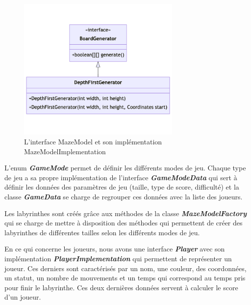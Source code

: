\begin{figure}[htb]
    \centering
    \includegraphics[width=8cm]{ressources/Implementation/Labyrinthe/Modele/DepthFirstGenerator.png}
    \caption{L'interface MazeModel et son implémentation MazeModelImplementation}
    \label{fig:MazeModelAndImplementation}
\end{figure}

L'enum \textbf{\textit{GameMode}} permet de définir les différents modes de
jeu. Chaque type de jeu a sa propre implémentation de l'interface
\textbf{\textit{GameModeData}} qui sert à définir les données des paramètres de
jeu (taille, type de score, difficulté) et la classe \textbf{\textit{GameData}}
se charge de regrouper ces données avec la liste des joueurs.

Les labyrinthes sont créés grâce aux méthodes de la classe
\textbf{\textit{MazeModelFactory}} qui se charge de mettre à disposition des
méthodes qui permettent de créer des labyrinthes de différentes tailles selon
les différents modes de jeu.

En ce qui concerne les joueurs, nous avons une interface
\textbf{\textit{Player}} avec son implémentation
\textbf{\textit{PlayerImplementation}} qui permettent de représenter un joueur.
Ces derniers sont caractérisés par un nom, une couleur, des coordonnées, un
statut, un nombre de mouvements et un temps qui correspond au temps pris pour
finir le labyrinthe. Ces deux dernières données servent à calculer le score
d'un joueur.

